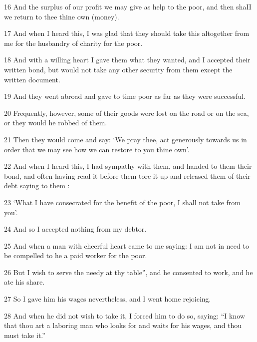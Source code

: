 \par 16 And the surplus of our profit we may give as help to the poor, and then shaII we return to thee thine own (money).

\par 17 And when I heard this, I was glad that they should take this altogether from me for the husbandry of charity for the poor.

\par 18 And with a willing heart I gave them what they wanted, and I accepted their written bond, but would not take any other security from them except the written document.

\par 19 And they went abroad and gave to time poor as far as they were successful.

\par 20 Frequently, however, some of their goods were lost on the road or on the sea, or they would he robbed of them.

\par 21 Then they would come and say: ‘We pray thee, act generously towards us in order that we may see how we can restore to you thine own’.

\par 22 And when I heard this, I had sympathy with them, and handed to them their bond, and often having read it before them tore it up and released them of their debt saying to them :

\par 23 ‘What I have consecrated for the benefit of the poor, I shall not take from you’.

\par 24 And so I accepted nothing from my debtor.

\par 25 And when a man with cheerful heart came to me saying: I am not in need to be compelled to he a paid worker for the poor.

\par 26 But I wish to serve the needy at thy table”, and he consented to work, and he ate his share.

\par 27 So I gave him his wages nevertheless, and I went home rejoicing.

\par 28 And when he did not wish to take it, I forced him to do so, saying: “I know that thou art a laboring man who looks for and waits for his wages, and thou must take it.”


